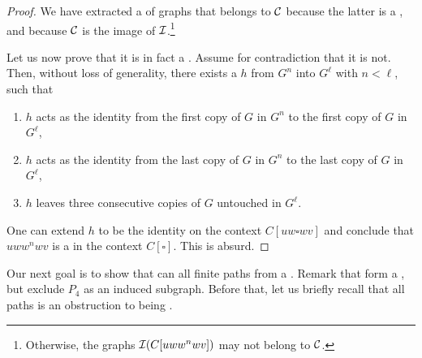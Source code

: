 \begin{proof}
  We have extracted a  of graphs that belongs to $\Cls$
  because the latter is a , and because $\Cls$ is the 
  image of $\mathcal{I}$.\footnote{Otherwise, the graphs $\mathcal{I}(C[u w w^n w v])$
  may not belong to $\Cls$.}

  Let us now prove that 
  it is in fact a . Assume for contradiction 
  that it is not.
  Then, without loss of generality, there exists a 
  $h$
  from $G^n$ into $G^\ell$ with $n < \ell$, such that 
  \begin{enumerate}
    \item $h$ acts as the identity from the first copy of $G$ in 
      $G^n$ to the first copy of $G$ in $G^\ell$,
    \item $h$ acts as the identity from the last copy of $G$ in $G^n$
      to the last copy of $G$ in $G^\ell$,
    \item $h$ leaves three consecutive copies of $G$ untouched in $G^\ell$.
  \end{enumerate}

  One can extend $h$ to be the identity on the 
  context $C[uw \square wv]$ and conclude that 
  $uw w^n wv$ is a  in the context $C[\square]$.
  This is absurd.
\end{proof}


\AP Our next goal is to show that can  all finite
paths from a . Remark that 
form a , but exclude $P_4$ as an induced subgraph. Before
that, let us briefly recall that  all paths is an
obstruction to being .

